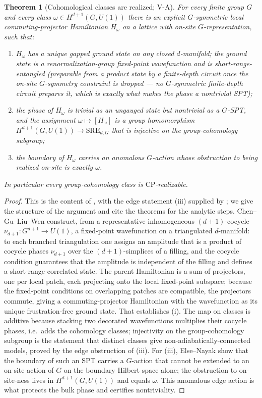 \documentclass[12pt]{article}
\newcommand{\SRE}{\mathrm{SRE}}                  %
\newcommand{\CP}{\mathrm{CP}}                    %
\newtheorem{theorem}{Theorem}[section]
\theoremstyle{definition}
\theoremstyle{remark}
\begin{document}
\begin{theorem}[Cohomological classes are realized; V-A]
\label{thm:VA}
For every finite group $G$ and every class $\omega\in H^{d+1}(G,U(1))$ there is an explicit
$G$-symmetric local commuting-projector Hamiltonian $H_\omega$ on a lattice with on-site
$G$-representation, such that:
\begin{enumerate}
  \item[(i)] $H_\omega$ has a unique gapped ground state on any closed $d$-manifold; the
        ground state is a renormalization-group fixed-point wavefunction and is
        short-range-entangled (preparable from a product state by a finite-depth circuit once
        the on-site $G$-symmetry constraint is dropped --- no $G$-symmetric finite-depth
        circuit prepares it, which is exactly what makes the phase a nontrivial SPT);
  \item[(ii)] the phase of $H_\omega$ is trivial as an ungauged state but nontrivial as a
        $G$-SPT, and the assignment $\omega\mapsto[H_\omega]$ is a group homomorphism
        $H^{d+1}(G,U(1))\to\SRE_{d,G}$ that is injective on the group-cohomology subgroup;
  \item[(iii)] the boundary of $H_\omega$ carries an anomalous $G$-action whose obstruction
        to being realized on-site is exactly $\omega$.
\end{enumerate}
In particular every group-cohomology class is $\CP$-realizable.
\end{theorem}

\begin{proof}
This is the content of \cite{cglw-cohomology}, with the edge statement (iii) supplied by
\cite{else-nayak}; we give the structure of the argument and cite the theorems for the
analytic steps. Chen--Gu--Liu--Wen construct, from a representative inhomogeneous
$(d+1)$-cocycle $\nu_{d+1}\colon G^{d+1}\to U(1)$, a fixed-point wavefunction on a
triangulated $d$-manifold: to each branched triangulation one assigns an amplitude that is a
product of cocycle phases $\nu_{d+1}$ over the $(d+1)$-simplices of a filling, and the
cocycle condition guarantees that the amplitude is independent of the filling and defines a
short-range-correlated state. The parent Hamiltonian is a sum of projectors, one per local
patch, each projecting onto the local fixed-point subspace; because the fixed-point
conditions on overlapping patches are compatible, the projectors commute, giving a
commuting-projector Hamiltonian with the wavefunction as its unique frustration-free ground
state. That establishes (i). The map on classes is additive because stacking two decorated
wavefunctions multiplies their cocycle phases, i.e.\ adds the cohomology classes; injectivity
on the group-cohomology subgroup is the statement that distinct classes give
non-adiabatically-connected models, proved by the edge obstruction of (iii). For (iii),
Else--Nayak show that the boundary of such an SPT carries a $G$-action that cannot be
extended to an on-site action of $G$ on the boundary Hilbert space alone; the obstruction to
on-site-ness lives in $H^{d+1}(G,U(1))$ and equals $\omega$. This anomalous edge action is
what protects the bulk phase and certifies nontriviality.
\end{proof}
\end{document}
